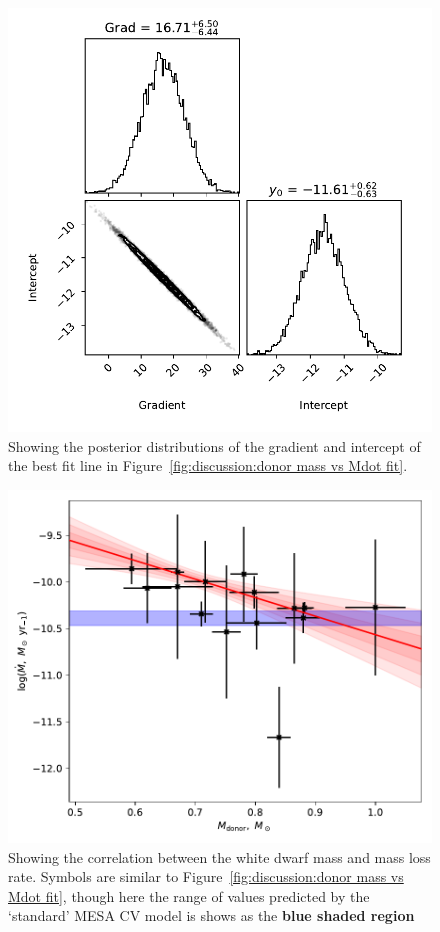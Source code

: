 \begin{figure}
    \centering
    \includegraphics[width=\textwidth]{figures/results/Mdot/Mr_Mdot_corner.pdf}
    \caption{Showing the posterior distributions of the gradient and intercept of the best fit line in Figure~\ref{fig:discussion:donor mass vs Mdot fit}.}
    \label{fig:discussion:donor mass vs Mdot corner}
\end{figure}
\begin{figure}
    \centering
    \includegraphics[width=\textwidth]{figures/results/Mdot/Mwd_Mdot.pdf}
    \caption{Showing the correlation between the white dwarf mass and mass loss rate. Symbols are similar to Figure~\ref{fig:discussion:donor mass vs Mdot fit}, though here the range of values predicted by the `standard' MESA CV model is shows as the {\bf blue shaded region}}
    \label{fig:discussion:white dwarf mass vs Mdot fit}
\end{figure}
